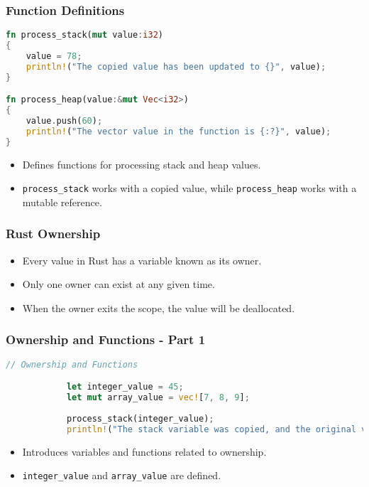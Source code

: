 \documentclass[aspectratio=169, table]{beamer}
\begin{document}
\begin{frame}[fragile]
\frametitle{Function Definitions}
\vspace{12pt}
\begin{lstlisting}[language=Rust]
fn process_stack(mut value:i32)    
{   
	value = 78; 
	println!("The copied value has been updated to {}", value); 
}

fn process_heap(value:&mut Vec<i32>)    
{
	value.push(60);    
	println!("The vector value in the function is {:?}", value); 
}
\end{lstlisting}
\begin{itemize}
\item Defines functions for processing stack and heap values.
\item \texttt{process\_stack} works with a copied value, while \texttt{process\_heap} works with a mutable reference.
\end{itemize}
\end{frame}

\begin{frame}[fragile]
\frametitle{Rust Ownership}
\begin{itemize}
\item Every value in Rust has a variable known as its owner.
\item Only one owner can exist at any given time.
\item When the owner exits the scope, the value will be deallocated.
\end{itemize}
\end{frame}

\begin{frame}[fragile]
	\frametitle{Ownership and Functions - Part 1}
	\begin{lstlisting}[language=Rust]
			// Ownership and Functions

			let integer_value = 45;  
			let mut array_value = vec![7, 8, 9]; 
			
			process_stack(integer_value); 
			println!("The stack variable was copied, and the original value was {}", integer_value);
		\end{lstlisting}
		\begin{itemize}
			\item Introduces variables and functions related to ownership.
			\item \texttt{integer\_value} and \texttt{array\_value} are defined.
		\end{itemize}
	\end{frame}
	
\end{document}
